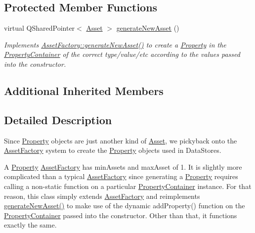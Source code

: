 \subsection*{Protected Member Functions}
\begin{DoxyCompactItemize}
\item 
\hypertarget{class_picto_1_1_property_factory_af3fc9ef345c1021dc8c12801c8ea0271}{virtual Q\-Shared\-Pointer$<$ \hyperlink{class_picto_1_1_asset}{Asset} $>$ \hyperlink{class_picto_1_1_property_factory_af3fc9ef345c1021dc8c12801c8ea0271}{generate\-New\-Asset} ()}\label{class_picto_1_1_property_factory_af3fc9ef345c1021dc8c12801c8ea0271}

\begin{DoxyCompactList}\small\item\em Implements \hyperlink{class_picto_1_1_asset_factory_a14e947ad4b201432c1cf59e1211fc47a}{Asset\-Factory\-::generate\-New\-Asset()} to create a \hyperlink{class_picto_1_1_property}{Property} in the \hyperlink{class_picto_1_1_property_container}{Property\-Container} of the correct type/value/etc according to the values passed into the constructor. \end{DoxyCompactList}\end{DoxyCompactItemize}
\subsection*{Additional Inherited Members}


\subsection{Detailed Description}
Since \hyperlink{class_picto_1_1_property}{Property} objects are just another kind of \hyperlink{class_picto_1_1_asset}{Asset}, we pickyback onto the \hyperlink{class_picto_1_1_asset_factory}{Asset\-Factory} system to create the \hyperlink{class_picto_1_1_property}{Property} objects used in Data\-Stores. 

A \hyperlink{class_picto_1_1_property}{Property} \hyperlink{class_picto_1_1_asset_factory}{Asset\-Factory} has min\-Assets and max\-Asset of 1. It is slightly more complicated than a typical \hyperlink{class_picto_1_1_asset_factory}{Asset\-Factory} since generating a \hyperlink{class_picto_1_1_property}{Property} requires calling a non-\/static function on a particular \hyperlink{class_picto_1_1_property_container}{Property\-Container} instance. For that reason, this class simply extends \hyperlink{class_picto_1_1_asset_factory}{Asset\-Factory} and reimplements \hyperlink{class_picto_1_1_property_factory_af3fc9ef345c1021dc8c12801c8ea0271}{generate\-New\-Asset()} to make use of the dynamic add\-Property() function on the \hyperlink{class_picto_1_1_property_container}{Property\-Container} passed into the constructor. Other than that, it functions exactly the same.

